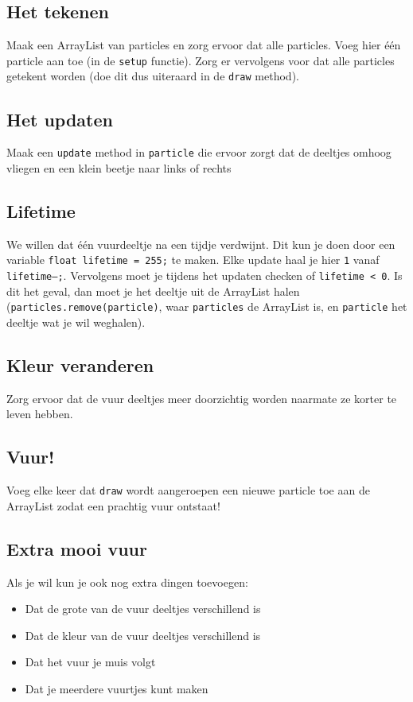 \documentclass[../syllabus.tex]{subfiles}
\begin{document}
\subsection{Het tekenen}
Maak een ArrayList van particles en zorg ervoor dat alle particles.
Voeg hier \'e\'en particle aan toe (in de \texttt{setup} functie).
Zorg er vervolgens voor dat alle particles getekent worden (doe dit dus uiteraard in de \texttt{draw} method).

\subsection{Het updaten}
Maak een \texttt{update} method in \texttt{particle} die ervoor zorgt dat de deeltjes omhoog vliegen en een klein beetje naar links of rechts

\subsection{Lifetime}
We willen dat \'e\'en vuurdeeltje na een tijdje verdwijnt. Dit kun je doen door een variable \texttt{float lifetime = 255;} te maken. Elke update haal je hier \texttt{1} vanaf \texttt{lifetime--;}. Vervolgens moet je tijdens het updaten checken of \texttt{lifetime < 0}. Is dit het geval, dan moet je het deeltje uit de ArrayList halen (\texttt{particles.remove(particle)}, waar \texttt{particles} de ArrayList is, en \texttt{particle} het deeltje wat je wil weghalen).

\subsection{Kleur veranderen}
Zorg ervoor dat de vuur deeltjes meer doorzichtig worden naarmate ze korter te leven hebben.

\subsection{Vuur!}
Voeg elke keer dat \texttt{draw} wordt aangeroepen een nieuwe particle toe aan de ArrayList zodat een prachtig vuur ontstaat!

\subsection{Extra mooi vuur}
Als je wil kun je ook nog extra dingen toevoegen:
\begin{itemize}
    \item Dat de grote van de vuur deeltjes verschillend is
    \item Dat de kleur van de vuur deeltjes verschillend is
    \item Dat het vuur je muis volgt
    \item Dat je meerdere vuurtjes kunt maken
\end{itemize}
\end{document}
